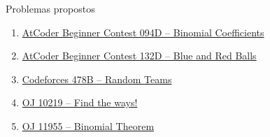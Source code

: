 \begin{frame}[fragile]{Problemas propostos}

    \begin{enumerate}
        \item \href{https://atcoder.jp/contests/abc094/tasks/arc095_b}{AtCoder Beginner Contest 094D -- Binomial Coefficients}

        \item \href{https://atcoder.jp/contests/abc132/tasks/abc132_d}{AtCoder Beginner Contest 132D -- Blue and Red Balls}
        \item \href{https://codeforces.com/problemset/problem/478/B}{Codeforces 478B -- Random Teams}
        \item \href{https://onlinejudge.org/index.php?option=com_onlinejudge&Itemid=8&category=24&page=show_problem&problem=1160}{OJ 10219 -- Find the ways!}

        \item \href{https://onlinejudge.org/index.php?option=com_onlinejudge&Itemid=8&category=24&page=show_problem&problem=3106}{OJ 11955 -- Binomial Theorem}
    \end{enumerate}

\end{frame}
